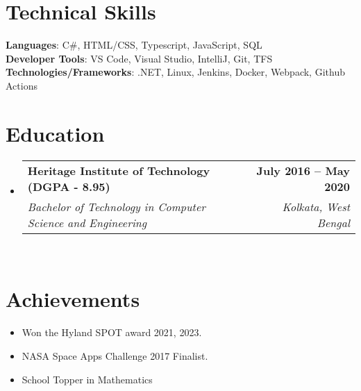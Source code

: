 \documentclass[letterpaper,11pt]{article}
\makeatletter
\newcommand{\resumeItem}[1]{
  \item\small{
    {#1 \vspace{-2pt}}
  }
}
\newcommand{\resumeSubheading}[4]{
  \vspace{-2pt}\item
    \begin{tabular*}{1.0\textwidth}[t]{l@{\extracolsep{\fill}}r}
      \textbf{#1} & \textbf{\small #2} \\
      \textit{\small#3} & \textit{\small #4} \\
    \end{tabular*}\vspace{-7pt}
}
\newcommand{\resumeSubItem}[1]{\resumeItem{#1}\vspace{-4pt}}
\newcommand{\resumeSubHeadingListStart}{\begin{itemize}[leftmargin=0.0in, label={}]}
\newcommand{\resumeSubHeadingListEnd}{\end{itemize}}
\newcommand{\resumeItemListStart}{\begin{itemize}}
\newcommand{\resumeItemListEnd}{\end{itemize}\vspace{-5pt}}
\makeatother
\begin{document}
%
\section{Technical Skills}
 \begin{itemize}[leftmargin=0.15in, label={}]
    \small{\item{
     \textbf{Languages}{: C\#, HTML/CSS, Typescript, JavaScript, SQL} \\
     \textbf{Developer Tools}{: VS Code, Visual Studio, IntelliJ, Git, TFS} \\
     \textbf{Technologies/Frameworks}{: .NET, Linux, Jenkins, Docker, Webpack, Github Actions} \\
    }}
 \end{itemize}
 \vspace{-16pt}

 
\section{Education}
  \resumeSubHeadingListStart
    \resumeSubheading
      {Heritage Institute of Technology (DGPA - 8.95) }{July 2016 -- May 2020}
      {Bachelor of Technology in Computer Science and Engineering} {Kolkata, West Bengal} \\
   
  \resumeSubHeadingListEnd



\section{Achievements}
    \resumeItemListStart
        \resumeSubItem{Won the Hyland SPOT award 2021, 2023.}
        \resumeSubItem{NASA Space Apps Challenge 2017 Finalist.}
        \resumeSubItem{School Topper in Mathematics}
   
    \resumeItemListEnd
\end{document}
